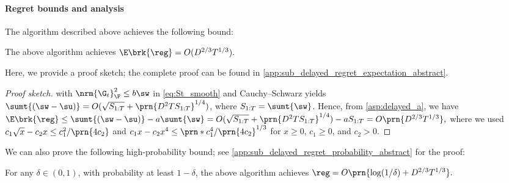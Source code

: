 \paragraph{Regret bounds and analysis}
The algorithm described above achieves the following bound:
\begin{theorem}
    \label{thm:delayed_regret_expectation_abstract}
    The above algorithm achieves
    $
        \E\brk{\reg}=O(D^{2/3}T^{1/3}).
    $
\end{theorem}
Here, we provide a proof sketch; the complete proof can be found in \cref{app:sub_delayed_regret_expectation_abstract}.
\begin{proof}[Proof sketch]
     with $\nrm{\G_t}_\F^2\leq b\sw$ in \eqref{eq:St_smooth} and Cauchy--Schwarz yields
    $\sumt{(\sw-\su)}=O(\sqrt{S_{1:T}}+\prn{D^2TS_{1:T}}^{1/4})$, where $S_{1:T}=\sumt{\sw}$.
    Hence, from \cref{asp:delayed_a}, we have
    $
        \E\brk{\reg}\leq \sumt{(\sw-\su)}-a\sumt{\sw}
        =O(\sqrt{S_{1:T}}+\prn{D^2TS_{1:T}}^{1/4})-aS_{1:T}
        =O\prn{D^{2/3}T^{1/3}},
    $
    where we used $c_1\sqrt{x}-c_2x\leq{c_1^2}/\prn{4c_2}$ and $c_1x-c_2x^4\leq\prn*{{c_1^4}/\prn{4c_2}}^{1/3}$ for $x\geq0$, $c_1\geq 0$, and $c_2>0$.
\end{proof}
We can also prove the following high-probability bound; see \cref{app:sub_delayed_regret_probability_abstract} for the proof:
\begin{theorem}
    \label{thm:delayed_regret_probability_abstract}
    For any $\delta \in (0,1)$,
    with probability at least $1 - \delta$, the above algorithm achieves 
    $
        \reg = O\prn{\log({1}/{\delta}) + D^{2/3}T^{1/3}}.
    $
\end{theorem}

